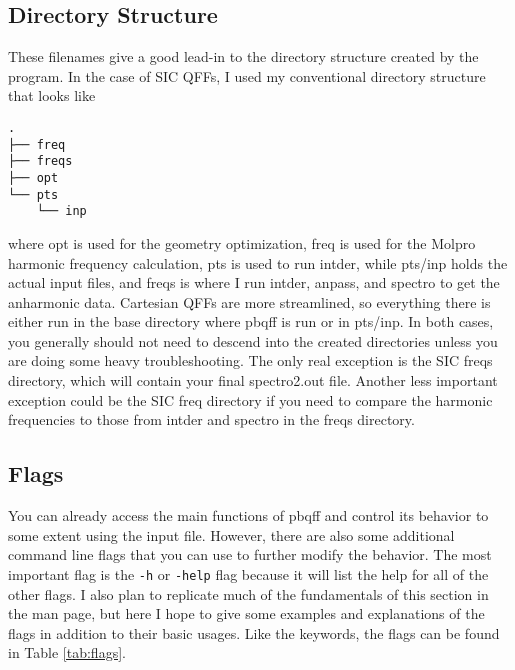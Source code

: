 \documentclass{article}
\begin{document}
\subsection{Directory Structure}

These filenames give a good lead-in to the directory structure created
by the program. In the case of SIC QFFs, I used my conventional
directory structure that looks like

\begin{verbatim}
.
├── freq
├── freqs
├── opt
└── pts
    └── inp
\end{verbatim}

\noindent
where opt is used for the geometry optimization, freq is used for the
Molpro harmonic frequency calculation, pts is used to run intder,
while pts/inp holds the actual input files, and freqs is where I run
intder, anpass, and spectro to get the anharmonic data. Cartesian QFFs
are more streamlined, so everything there is either run in the base
directory where pbqff is run or in pts/inp. In both cases, you
generally should not need to descend into the created directories
unless you are doing some heavy troubleshooting. The only real
exception is the SIC freqs directory, which will contain your final
spectro2.out file. Another less important exception could be the SIC
freq directory if you need to compare the harmonic frequencies to
those from intder and spectro in the freqs directory.


\subsection{Flags}

You can already access the main functions of pbqff and control its
behavior to some extent using the input file. However, there are also
some additional command line flags that you can use to further modify
the behavior. The most important flag is the \verb|-h| or \verb|-help|
flag because it will list the help for all of the other flags. I also
plan to replicate much of the fundamentals of this section in the man
page, but here I hope to give some examples and explanations of the
flags in addition to their basic usages. Like the keywords, the flags
can be found in Table \ref{tab:flags}.
\end{document}

